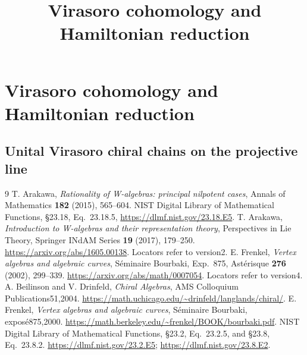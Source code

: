 \documentclass[11pt,oneside]{memoir}
\title{Virasoro cohomology and Hamiltonian reduction}
\author{}
\date{}
\providecommand{\Res}{\operatorname{Res}}
\begin{document}
\chapter{Virasoro cohomology and Hamiltonian reduction}







\begingroup
\providecommand{\Res}{\operatorname{Res}}\providecommand{\Vir}{\operatorname{Vir}}\providecommand{\Aut}{\operatorname{Aut}}

\endgroup
\section{Unital Virasoro chiral chains on the projective line}\label{sec:cbc26-unital-p1}



\begin{thebibliography}{9}
 T. Arakawa, \emph{Rationality of W-algebras: principal nilpotent cases}, Annals of Mathematics \textbf{182} (2015), 565--604.
 NIST Digital Library of Mathematical Functions, \S23.18, Eq.~23.18.5, \url{https://dlmf.nist.gov/23.18.E5}.
 T. Arakawa, \emph{Introduction to W-algebras and their representation theory}, Perspectives in Lie Theory, Springer INdAM Series \textbf{19} (2017), 179--250. \url{https://arxiv.org/abs/1605.00138}. Locators refer to version2.
 E. Frenkel, \emph{Vertex algebras and algebraic curves}, S\'eminaire Bourbaki, Exp.~875, Ast\'erisque \textbf{276} (2002), 299--339. \url{https://arxiv.org/abs/math/0007054}. Locators refer to version4.
 A. Beilinson and V. Drinfeld, \emph{Chiral Algebras}, AMS Colloquium Publications51,2004. \url{https://math.uchicago.edu/~drinfeld/langlands/chiral/}.
 E. Frenkel, \emph{Vertex algebras and algebraic curves}, S\'eminaire Bourbaki, expos\'e875,2000. \url{https://math.berkeley.edu/~frenkel/BOOK/bourbaki.pdf}.
 NIST Digital Library of Mathematical Functions, \S23.2, Eq.~23.2.5, and \S23.8, Eq.~23.8.2. \url{https://dlmf.nist.gov/23.2.E5}; \url{https://dlmf.nist.gov/23.8.E2}.
\end{thebibliography}
\end{document}
